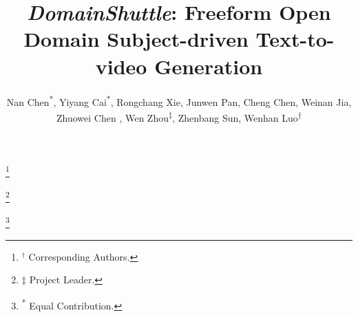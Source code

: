 \documentclass[]{unifiedreward}
\title{
   \textit{DomainShuttle}: Freeform Open Domain Subject-driven Text-to-video Generation
}
\author{
    Nan Chen\textsuperscript{*}, 
    Yiyang Cai\textsuperscript{*},   
    Rongchang Xie,
    Junwen Pan, 
    Cheng Chen,
    Weinan Jia, \\
    Zhuowei Chen ,
    Wen Zhou\textsuperscript{$\ddagger$},
     Zhenbang Sun,
     Wenhan Luo\textsuperscript{$\dagger$}
}
\affiliation[1]{\mbox{Hong Kong University of Science and Technology}}
\newcommand\blfootnote[1]{%
  \begingroup
  \renewcommand\thefootnote{}\footnote{#1}%
  \addtocounter{footnote}{-1}%
  \endgroup
}
\begin{document}
\maketitle

\blfootnote{$^\dagger$ Corresponding Authors.}
\blfootnote{$\ddagger$ Project Leader.}
\blfootnote{\textsuperscript{*} Equal Contribution.}








% 





\clearpage
\beginappendix


\end{document}
